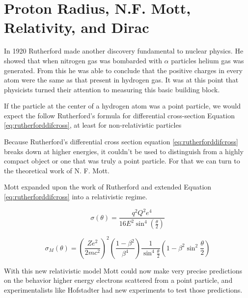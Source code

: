 \documentclass[12pt]{article}
\begin{document}
\section{Proton Radius, N.F. Mott, Relativity, and Dirac}

In 1920 Rutherford made another discovery fundamental to nuclear physics. He showed that when nitrogen gas was bombarded with $\alpha$ particles helium gas was generated. From this he was able to conclude that the positive charges in every atom were the same as that present in hydrogen gas\cite{Rutherford1920}. It was at this point that physicists turned their attention to measuring this basic building block.

If the particle at the center of a hydrogen atom was a point particle, we would expect the follow Rutherford's formula for differential cross-section Equation \ref{eq:rutherforddifcross}, at least for non-relativistic particles \cite{Hofstadter1956}

Because Rutherford's differential cross section equation \ref{eq:rutherforddifcross} breaks down at higher energies, it couldn't be used to distinguish from a highly compact object or one that was truly a point particle. For that we can turn to the theoretical work of N. F. Mott.

Mott expanded upon the work of Rutherford and extended Equation \ref{eq:rutherforddifcross} into a relativistic regime\cite{Hofstadter1956}.

\begin{equation}\label{eq:rutherforddifcross}
    \sigma(\theta) = \frac{q^2Q^2e^4}{16E^2\sin^4(\frac{\theta}{2})}
\end{equation}

\begin{equation}\label{eq:mottscatter}
    \sigma_M(\theta) = (\frac{Ze^2}{2mc^2})^2(\frac{1-\beta^2}{\beta^4})\frac{1}{\sin^4{\frac{\theta}{2}}}(1-\beta^2\sin^2\frac{\theta}{2})
\end{equation}

With this new relativistic model Mott could now make very precise predictions on the behavior higher energy electrons scattered from a point particle, and experimentalists like Hofstadter had new experiments to test those predictions. 
\end{document}
